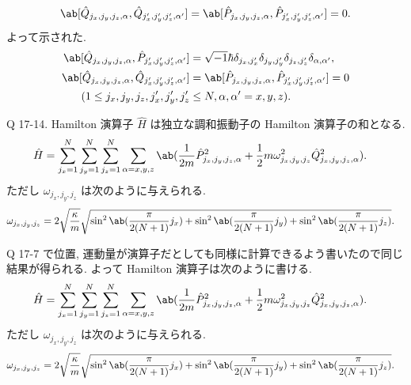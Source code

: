 \documentclass[uplatex,dvipdfmx,a4paper,11pt]{jlreq}
\numberwithin{equation}{section}
\theoremstyle{definition}
\begin{document}
\begin{align}
  \ab[\hat{Q}_{j_x,j_y,j_z,\alpha}, \hat{Q}_{j_x',j_y',j_z',\alpha'}] = \ab[\hat{P}_{j_x,j_y,j_z,\alpha}, \hat{P}_{j_x',j_y',j_z',\alpha'}] = 0.
\end{align}
よって示された.
\begin{align}
  \ab[\hat{Q}_{j_x,j_y,j_z,\alpha}, \hat{P}_{j_x',j_y',j_z',\alpha'}] & = \sqrt{-1}\hbar\delta_{j_x,j_x'}\delta_{j_y,j_y'}\delta_{j_z,j_z'}\delta_{\alpha,\alpha'}, \\
  \ab[\hat{Q}_{j_x,j_y,j_z,\alpha}, \hat{Q}_{j_x',j_y',j_z',\alpha'}] & = \ab[\hat{P}_{j_x,j_y,j_z,\alpha}, \hat{P}_{j_x',j_y',j_z',\alpha'}] = 0                   \\
  (1\leq j_x,j_y,j_z,j_x',j_y',j_z'                                   & \leq N, \alpha,\alpha' = x,y,z).
\end{align}

\begin{itembox}[l]{Q 17-14.}
  Hamilton 演算子 $\hat{H}$ は独立な調和振動子の Hamilton 演算子の和となる.
  \begin{align}
    \hat{H} & = \sum_{j_x=1}^{N}\sum_{j_y=1}^{N}\sum_{j_z=1}^{N}\sum_{\alpha=x,y,z}\ab(\frac{1}{2m}\hat{P}_{j_x,j_y,j_z,\alpha}^2 + \frac{1}{2}m\omega_{j_x,j_y,j_z}^2\hat{Q}_{j_x,j_y,j_z,\alpha}^2).
  \end{align}
  ただし $\omega_{j_x,j_y,j_z}$ は次のように与えられる.
  \begin{align}
    \omega_{j_x,j_y,j_z} & = 2\sqrt{\frac{\kappa}{m}}\sqrt{\sin^2\ab(\frac{\pi}{2(N+1)}j_x) + \sin^2\ab(\frac{\pi}{2(N+1)}j_y) + \sin^2\ab(\frac{\pi}{2(N+1)}j_z)}.
  \end{align}
\end{itembox}
Q 17-7 で位置, 運動量が演算子だとしても同様に計算できるよう書いたので同じ結果が得られる. よって Hamilton 演算子は次のように書ける.
\begin{align}
  \hat{H} & = \sum_{j_x=1}^{N}\sum_{j_y=1}^{N}\sum_{j_z=1}^{N}\sum_{\alpha=x,y,z}\ab(\frac{1}{2m}\hat{P}_{j_x,j_y,j_z,\alpha}^2 + \frac{1}{2}m\omega_{j_x,j_y,j_z}^2\hat{Q}_{j_x,j_y,j_z,\alpha}^2).
\end{align}
ただし $\omega_{j_x,j_y,j_z}$ は次のように与えられる.
\begin{align}
  \omega_{j_x,j_y,j_z} & = 2\sqrt{\frac{\kappa}{m}}\sqrt{\sin^2\ab(\frac{\pi}{2(N+1)}j_x) + \sin^2\ab(\frac{\pi}{2(N+1)}j_y) + \sin^2\ab(\frac{\pi}{2(N+1)}j_z)}.
\end{align}
\end{document}
